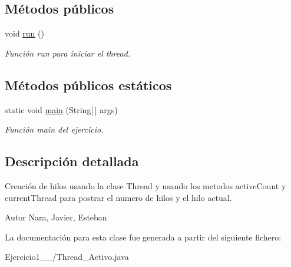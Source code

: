 \subsection*{Métodos públicos}
\begin{DoxyCompactItemize}
\item 
\hypertarget{class_ejercicio1__1__4_1_1_thread___activo_abf24f11ac559a1049ce909cb6db4abd8}{}void \hyperlink{class_ejercicio1__1__4_1_1_thread___activo_abf24f11ac559a1049ce909cb6db4abd8}{run} ()\label{class_ejercicio1__1__4_1_1_thread___activo_abf24f11ac559a1049ce909cb6db4abd8}

\begin{DoxyCompactList}\small\item\em Función run para iniciar el thread. \end{DoxyCompactList}\end{DoxyCompactItemize}
\subsection*{Métodos públicos estáticos}
\begin{DoxyCompactItemize}
\item 
\hypertarget{class_ejercicio1__1__4_1_1_thread___activo_ab3e61d53d79ec28d9a95bfabd9661a34}{}static void \hyperlink{class_ejercicio1__1__4_1_1_thread___activo_ab3e61d53d79ec28d9a95bfabd9661a34}{main} (String\mbox{[}$\,$\mbox{]} args)\label{class_ejercicio1__1__4_1_1_thread___activo_ab3e61d53d79ec28d9a95bfabd9661a34}

\begin{DoxyCompactList}\small\item\em Función main del ejercicio. \end{DoxyCompactList}\end{DoxyCompactItemize}


\subsection{Descripción detallada}
Creación de hilos usando la clase Thread y usando los metodos active\+Count y current\+Thread para postrar el numero de hilos y el hilo actual. 

\begin{DoxyAuthor}{Autor}
Nara, Javier, Esteban 
\end{DoxyAuthor}


La documentación para esta clase fue generada a partir del siguiente fichero\+:\begin{DoxyCompactItemize}
\item 
Ejercicio1\+\_\+\_/Thread\+\_\+\+Activo.\+java\end{DoxyCompactItemize}
